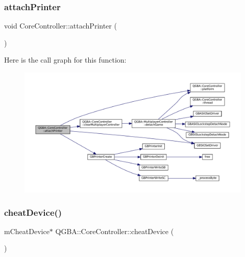 \mbox{\label{class_q_g_b_a_1_1_core_controller_a0a33c026a8e7338d13e29675269360f8}} 
\subsubsection{\texorpdfstring{attach\+Printer}{attachPrinter}}
{\footnotesize\ttfamily void Core\+Controller\+::attach\+Printer (\begin{DoxyParamCaption}{ }\end{DoxyParamCaption})\hspace{0.3cm}{\ttfamily [slot]}}

Here is the call graph for this function\+:
\nopagebreak
\begin{figure}[H]
\begin{center}
\leavevmode
\includegraphics[width=350pt]{class_q_g_b_a_1_1_core_controller_a0a33c026a8e7338d13e29675269360f8_cgraph}
\end{center}
\end{figure}
\mbox{\label{class_q_g_b_a_1_1_core_controller_aa0dc516043cdd3586765c7b27b79a85b}} 
\subsubsection{\texorpdfstring{cheat\+Device()}{cheatDevice()}}
{\footnotesize\ttfamily m\+Cheat\+Device$\ast$ Q\+G\+B\+A\+::\+Core\+Controller\+::cheat\+Device (\begin{DoxyParamCaption}{ }\end{DoxyParamCaption})\hspace{0.3cm}{\ttfamily [inline]}}

